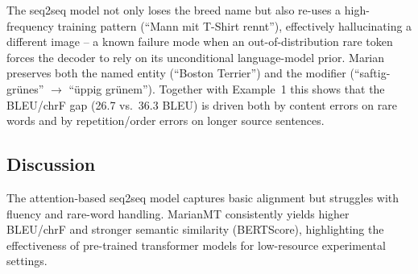 The seq2seq model not only loses the breed name but also re-uses a high-frequency training pattern (``Mann mit T-Shirt rennt''), effectively hallucinating a different image -- a known failure mode when an out-of-distribution rare token forces the decoder to rely on its unconditional language-model prior. Marian preserves both the named entity (``Boston Terrier'') and the modifier (``saftig-gr\"unes'' $\to$ ``\"uppig gr\"unem''). Together with Example~1 this shows that the BLEU/chrF gap (26.7 vs.\ 36.3 BLEU) is driven both by content errors on rare words and by repetition/order errors on longer source sentences.

\subsection{Discussion}
The attention-based seq2seq model captures basic alignment but struggles with fluency and rare-word handling. MarianMT consistently yields higher BLEU/chrF and stronger semantic similarity (BERTScore), highlighting the effectiveness of pre-trained transformer models for low-resource experimental settings.

